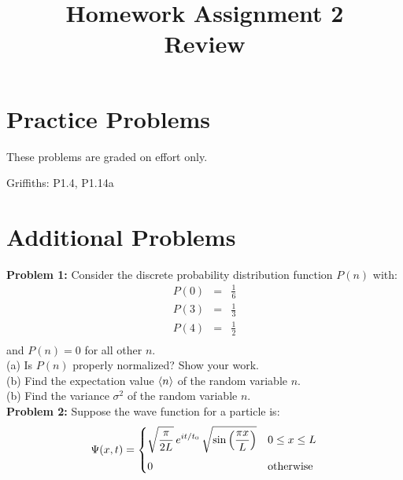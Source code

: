 \documentclass[12pt]{article}
\begin{document}

\date{\vspace{-5ex}}

\title{Homework Assignment 2 \\ Review}

\maketitle

\section*{Practice Problems}

These problems are graded on effort only.

Griffiths: P1.4, P1.14a

\section*{Additional Problems}

\noindent
    {\bf Problem 1:} Consider the discrete probability distribution function $P(n)$ with:
\begin{eqnarray*}
  P(0) &=& \frac{1}{6}\\[8pt]
  P(3) &=& \frac{1}{3}\\[8pt]
  P(4) &=& \frac{1}{2}\\
\end{eqnarray*}
and $P(n) = 0$ for all other $n$.\\[5pt]
(a) Is $P(n)$ properly normalized?  Show your work.\\[5pt]
(b) Find the expectation value $\braket{n}$ of the random variable $n$.\\[5pt]
(b) Find the variance $\sigma^2$ of the random variable $n$.\\ 

\vskip 1cm
\noindent
{\bf Problem 2:} Suppose the wave function for a particle is:
\begin{displaymath}
  \Psi(x,t) =
  \begin{cases}    
    {\displaystyle \sqrt{\frac{\pi}{2L}}\, e^{it/t_0} \, \sqrt{\sin\left(\frac{\pi x}{L}\right)}} & {\displaystyle 0 \leq x \leq L} \\[10pt]
    {\displaystyle 0} & {\displaystyle {\rm otherwise}} \\
  \end{cases}
\end{displaymath}
\end{document}
